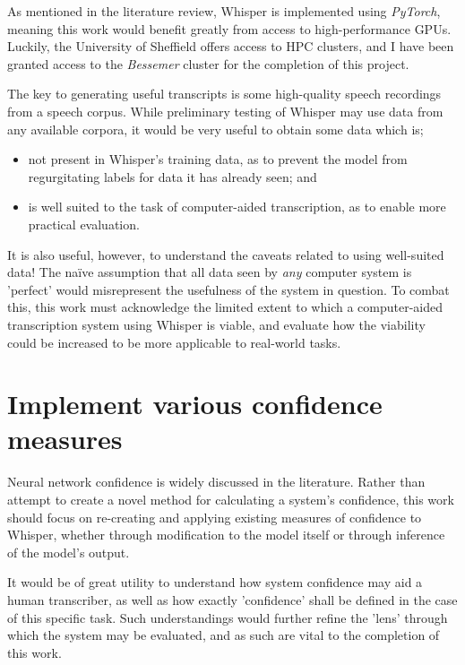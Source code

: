 As mentioned in the literature review, Whisper is implemented using \emph{PyTorch}, meaning this work would benefit greatly from access to high-performance GPUs.
Luckily, the University of Sheffield offers access to HPC clusters\cite{shef-hpc}, and I have been granted access to the \emph{Bessemer} cluster for the completion of this project.

The key to generating useful transcripts is some high-quality speech recordings from a speech corpus.
While preliminary testing of Whisper may use data from any available corpora, it would be very useful to obtain some data which is;

\begin{itemize}
        \item not present in Whisper's training data, as to prevent the model from regurgitating labels for data it has already seen; and
        \item is well suited to the task of computer-aided transcription, as to enable more practical evaluation.
\end{itemize}

It is also useful, however, to understand the caveats related to using well-suited data!
The na\"{i}ve assumption that all data seen by \emph{any} computer system is 'perfect' would misrepresent the usefulness of the system in question.
To combat this, this work must acknowledge the limited extent to which a computer-aided transcription system using Whisper is viable, and evaluate how the viability could be increased to be more applicable to real-world tasks.

\section{Implement various confidence measures}

Neural network confidence is widely discussed in the literature.
Rather than attempt to create a novel method for calculating a system's confidence, this work should focus on re-creating and applying existing measures of confidence to Whisper, whether through modification to the model itself or through inference of the model's output.

It would be of great utility to understand how system confidence may aid a human transcriber, as well as how exactly 'confidence' shall be defined in the case of this specific task.
Such understandings would further refine the 'lens' through which the system may be evaluated, and as such are vital to the completion of this work.

